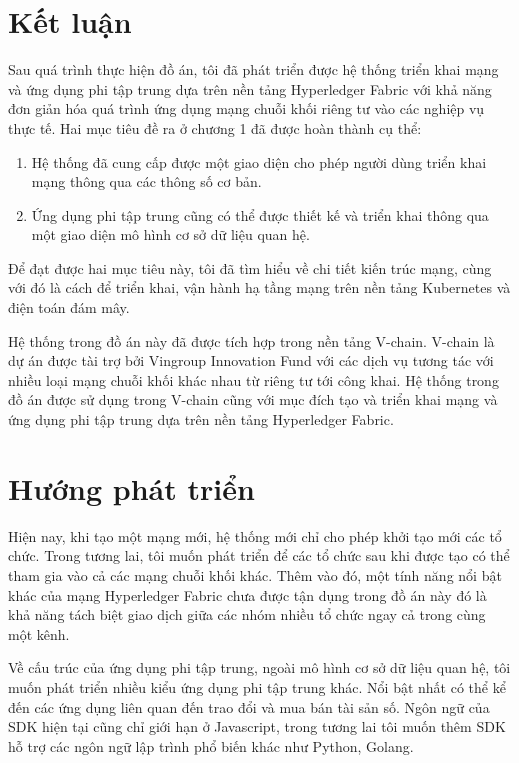 \documentclass[../DoAn.tex]{subfiles}
\begin{document}
\section{Kết luận}

Sau quá trình thực hiện đồ án, tôi đã phát triển được hệ thống triển khai mạng và ứng dụng phi tập trung dựa trên nền tảng Hyperledger Fabric với khả năng đơn giản hóa quá trình ứng dụng mạng chuỗi khối riêng tư vào các nghiệp vụ thực tế. Hai mục tiêu đề ra ở chương 1 đã được hoàn thành cụ thể:

\begin{enumerate}
  \item Hệ thống đã cung cấp được một giao diện cho phép người dùng triển khai mạng thông qua các thông số cơ bản.
  \item Ứng dụng phi tập trung cũng có thể được thiết kế và triển khai thông qua một giao diện mô hình cơ sở dữ liệu quan hệ. 
\end{enumerate}
  
Để đạt được hai mục tiêu này, tôi đã tìm hiểu về chi tiết kiến trúc mạng, cùng với đó là cách để triển khai, vận hành hạ tầng mạng trên nền tảng Kubernetes và điện toán đám mây.

Hệ thống trong đồ án này đã được tích hợp trong nền tảng V-chain\cite{vchain}. V-chain là dự án được tài trợ bởi Vingroup Innovation Fund với các dịch vụ tương tác với nhiều loại mạng chuỗi khối khác nhau từ riêng tư tới công khai. Hệ thống trong đồ án được sử dụng trong V-chain cũng với mục đích tạo và triển khai mạng và ứng dụng phi tập trung dựa trên nền tảng Hyperledger Fabric.

\section{Hướng phát triển}

Hiện nay, khi tạo một mạng mới, hệ thống mới chỉ cho phép khởi tạo mới các tổ chức. Trong tương lai, tôi muốn phát triển để các tổ chức sau khi được tạo có thể tham gia vào cả các mạng chuỗi khối khác. Thêm vào đó, một tính năng nổi bật khác của mạng Hyperledger Fabric chưa được tận dụng trong đồ án này đó là khả năng tách biệt giao dịch giữa các nhóm nhiều tổ chức ngay cả trong cùng một kênh.

Về cấu trúc của ứng dụng phi tập trung, ngoài mô hình cơ sở dữ liệu quan hệ, tôi muốn phát triển nhiều kiểu ứng dụng phi tập trung khác. Nổi bật nhất có thể kể đến các ứng dụng liên quan đến trao đổi và mua bán tài sản số. Ngôn ngữ của SDK hiện tại cũng chỉ giới hạn ở Javascript, trong tương lai tôi muốn thêm SDK hỗ trợ các ngôn ngữ lập trình phổ biến khác như Python, Golang.
\end{document}
